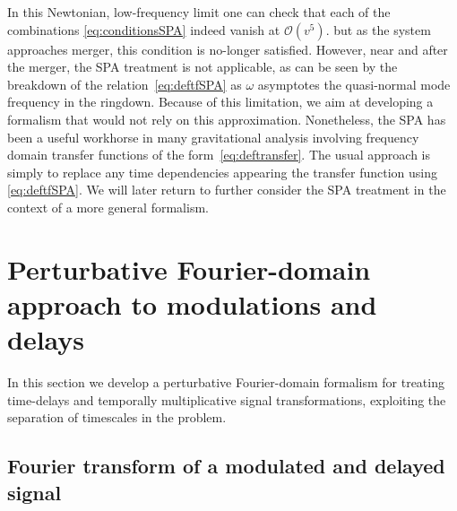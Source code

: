 \documentclass[aps,showpacs,twocolumn,
prd,superscriptaddress,nofootinbib]{revtex4-1}
\newcommand\calO{{\mathcal{O}}}
\begin{document}
In this Newtonian, low-frequency limit one can check that each of the combinations \eqref{eq:conditionsSPA} indeed vanish at $\calO{(v^5)}$. but as the system approaches merger, this condition is no-longer satisfied. However, near and after the merger, the SPA treatment is not applicable, as can be seen by the breakdown of the relation~\eqref{eq:deftfSPA} as $\omega$ asymptotes the quasi-normal mode frequency in the ringdown. Because of this limitation, we aim at developing a formalism that would not rely on this approximation. Nonetheless, the SPA has been a useful workhorse in many gravitational analysis involving frequency domain transfer functions of the form~\eqref{eq:deftransfer}. The usual approach is simply to replace any time dependencies appearing the transfer function using \eqref{eq:deftfSPA}. We will later return to further consider the SPA treatment in the context of a more general formalism.



\section{Perturbative Fourier-domain approach to modulations and delays}
\label{sec:formalism}


In this section we develop a perturbative Fourier-domain formalism for treating time-delays and temporally multiplicative signal transformations, exploiting the separation of timescales in the problem.

\subsection{Fourier transform of a modulated and delayed signal}
\label{subsec:FTgeneral}
\end{document}
